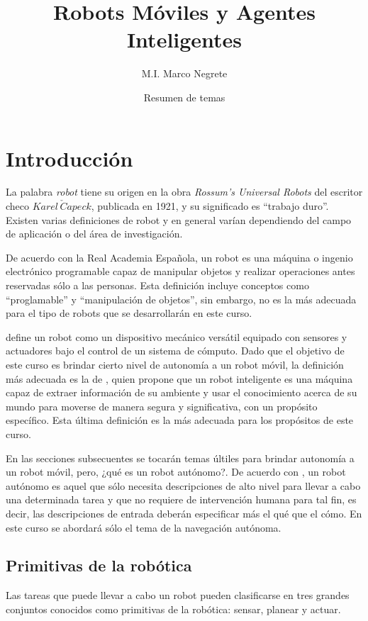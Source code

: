 \documentclass[letterpaper,12pt]{article}
\title{Robots Móviles y Agentes Inteligentes}
\author{M.I. Marco Negrete}
\date{Resumen de temas}
\begin{document}
\renewcommand{\tablename}{Tabla}
\maketitle

\tableofcontents

\section{Introducción}

La palabra \textit{robot} tiene su origen en la obra \textit{Rossum's Universal Robots} del escritor checo $Karel \,\check{C}apeck$, publicada en 1921, y su significado es ``trabajo duro''. Existen varias definiciones de robot y en general varían dependiendo del campo de aplicación o del área de investigación. 

De acuerdo con la Real Academia Española, un robot es una máquina o ingenio electrónico programable capaz de manipular objetos y realizar operaciones antes reservadas sólo a las personas. Esta definición incluye conceptos como ``proglamable'' y ``manipulación de objetos'', sin embargo, no es la más adecuada para el tipo de robots que se desarrollarán en este curso. 

\cite{Latombe1991MotionPlanning} define un robot como un dispositivo mecánico versátil equipado con sensores y actuadores bajo el control de un sistema de cómputo. Dado que el objetivo de este curso es brindar cierto nivel de autonomía a un robot móvil, la definición más adecuada es la de \cite{Arkin1998BehBasedRobo}, quien propone que un robot inteligente es una máquina capaz de extraer información de su ambiente y usar el conocimiento acerca de su mundo para moverse de manera segura y significativa, con un propósito específico. Esta última definición es la más adecuada para los propósitos de este curso. 

En las secciones subsecuentes se tocarán temas últiles para brindar autonomía a un robot móvil, pero, ¿qué es un robot autónomo?. De acuerdo con \cite{Latombe1991MotionPlanning}, un robot autónomo es aquel que sólo necesita descripciones de alto nivel para llevar a cabo una determinada tarea y que no requiere de intervención humana para tal fin, es decir, las descripciones de entrada deberán especificar más el qué que el cómo. En este curso se abordará sólo el tema de la navegación autónoma. 

\subsection{Primitivas de la robótica}
Las tareas que puede llevar a cabo un robot pueden clasificarse en tres grandes conjuntos conocidos como primitivas de la robótica: sensar, planear y actuar. 
\end{document}
